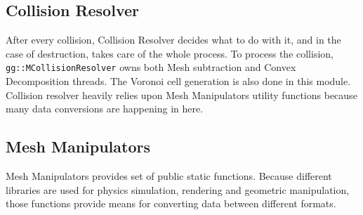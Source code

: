 \subsection*{Collision Resolver}
After every collision, Collision Resolver decides what to do with it, and in the case of destruction, takes care of the whole process. To process the collision, {\tt gg::MCollisionResolver} owns both Mesh subtraction and Convex Decomposition threads. The Voronoi cell generation is also done in this module. Collision resolver heavily relies upon Mesh Manipulators utility functions because many data conversions are happening in here.

\subsection*{Mesh Manipulators}
Mesh Manipulators provides set of public static  functions. Because different libraries are used for physics simulation, rendering and geometric manipulation, those functions provide means for converting data between different formats.
